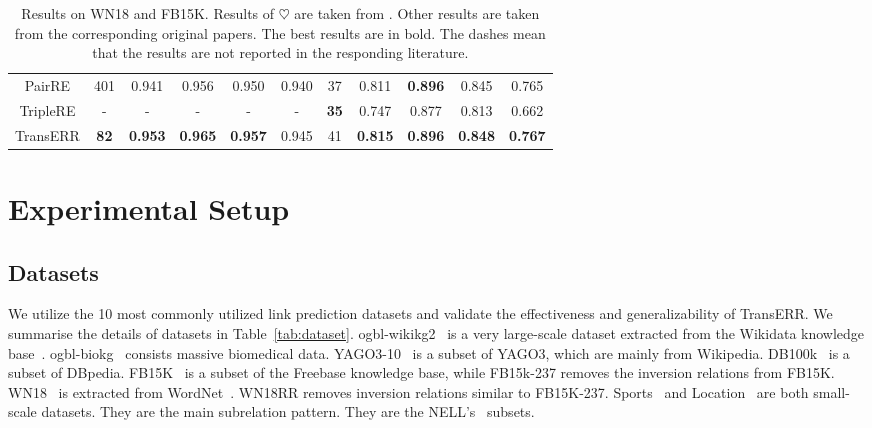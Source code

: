 \documentclass[10pt, a4paper]{article}
\begin{document}
\begin{table}[!htb]
{\begin{tabular}{ccccccccccc}
			PairRE             & 401                                 & 0.941                                  & 0.956              & 0.950              & 0.940              & 37 & 0.811          & \textbf{0.896} & 0.845          & 0.765          \\ 
			TripleRE   & -                                     & -                                   & -              & -              & -              & \textbf{35}   & 0.747          & 0.877          & 0.813          & 0.662          \\ \hline
			TransERR            & \textbf{82}                       & \textbf{0.953}                     & \textbf{0.965} & \textbf{0.957} & 0.945          & 41          & \textbf{0.815} & \textbf{0.896} & \textbf{0.848} & \textbf{0.767} \\ \hline
		\end{tabular}}
	\caption{Results on WN18 and FB15K. Results of $\heartsuit $ are taken from \citet{31sun2019rotate}.  Other results are taken from the corresponding original papers. The best results are in bold. The dashes mean that the results are not reported in the responding literature.}
	\label{tab:wn+fb}
\end{table}




\section{Experimental Setup}


\subsection{Datasets}
We utilize the 10 most commonly utilized link prediction datasets and validate the effectiveness and generalizability of TransERR. We summarise the details of datasets in Table~\ref{tab:dataset}. ogbl-wikikg2~\cite{hu2020open} is a very large-scale dataset extracted from the Wikidata knowledge base~\cite{10.1145/2629489}. ogbl-biokg~\cite{hu2020open} consists massive biomedical data. YAGO3-10~\cite{6suchanek2007yago} is a subset of YAGO3, which are mainly from Wikipedia. DB100k~\cite{63ding2018improving} is a subset of DBpedia. FB15K~\cite{7bordes2013translating} is a subset of the Freebase knowledge base, while {FB15k-237} \cite{36toutanova2015observed} removes the inversion relations from FB15K. {WN18}~\cite{7bordes2013translating} is extracted from WordNet~\cite{5miller1995wordnet}. {WN18RR} \cite{11dettmers2018convolutional} removes inversion relations similar to FB15K-237. {Sports}~\cite{62wang2015knowledge} and {Location}~\cite{62wang2015knowledge} are both small-scale datasets. They are the main subrelation pattern. They are the NELL's~\cite{46mitchell2018never} subsets.
\end{document}
